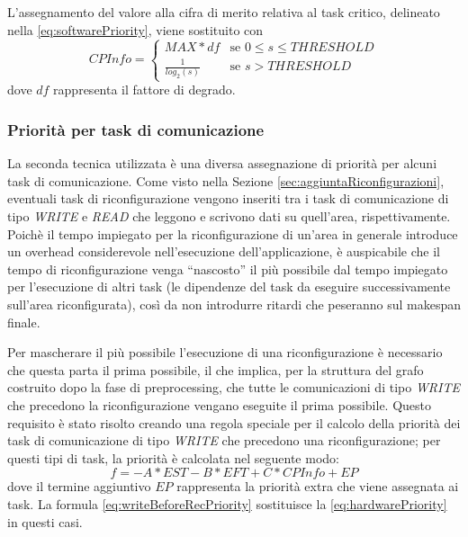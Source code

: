 L'assegnamento del valore alla cifra di merito relativa al task critico, 
delineato nella \ref{eq:softwarePriority}, viene sostituito con
\begin{equation} \label{eq:newSoftwarePriority}
 CPInfo = \begin{cases}
           MAX*df & \mbox{se } 0 \leq s \leq THRESHOLD\\
           \frac{1}{log_2\left(s\right)} & \mbox{se } s > THRESHOLD
           \end{cases}
\end{equation}
dove $df$ rappresenta il fattore di degrado.

\subsubsection{Priorità per task di comunicazione}
La seconda tecnica utilizzata è una diversa assegnazione di priorità per alcuni 
task di comunicazione. Come visto nella Sezione 
\ref{sec:aggiuntaRiconfigurazioni}, eventuali task di riconfigurazione vengono 
inseriti tra i task di comunicazione di tipo \emph{WRITE} e \emph{READ} che 
leggono e scrivono dati su quell'area, rispettivamente. Poichè il tempo 
impiegato per la riconfigurazione di un'area in generale introduce un 
overhead considerevole nell'esecuzione dell'applicazione, è auspicabile che 
il tempo di riconfigurazione venga ``nascosto'' il più possibile dal tempo 
impiegato per l'esecuzione di altri task (le dipendenze del task da eseguire 
successivamente sull'area riconfigurata), così da non introdurre ritardi che 
peseranno sul makespan finale.

Per mascherare il più possibile l'esecuzione di una riconfigurazione è 
necessario che questa parta il prima possibile, il che implica, per la 
struttura del grafo costruito dopo la fase di preprocessing, che tutte le 
comunicazioni di tipo \emph{WRITE} che precedono la riconfigurazione vengano 
eseguite il prima possibile. Questo requisito è stato risolto creando una 
regola speciale per il calcolo della priorità dei task di comunicazione di tipo 
\emph{WRITE} che precedono una riconfigurazione; per questi tipi di task, la 
priorità è calcolata nel seguente modo:
\begin{equation} \label{eq:writeBeforeRecPriority}
 f=-A*EST - B*EFT + C*CPInfo + EP
\end{equation}
dove il termine aggiuntivo $EP$ rappresenta la priorità extra che viene 
assegnata ai task. La formula \ref{eq:writeBeforeRecPriority} sostituisce la 
\ref{eq:hardwarePriority} in questi casi.


